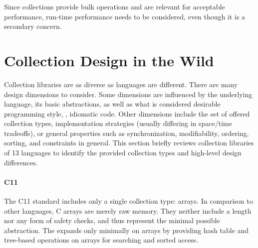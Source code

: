 \documentclass[sigconf, 10pt]{acmart}
\begin{document}
Since collections provide bulk operations
and are relevant for acceptable performance,
run-time performance needs to be considered,
even though it is a secondary concern.

\section{Collection Design in the Wild}
\label{sec:col-wild}


Collection libraries are as diverse as languages are different.
There are many design dimensions to consider.
Some dimensions are influenced by the underlying language,
its basic abstractions,
as well as what is considered desirable programming style, \ie, idiomatic code.
Other dimensions include the set of offered collection types,
implementation strategies (usually differing in space/time tradeoffs),
or general properties such as synchronization, modifiability, ordering,
sorting, and constraints in general.
%
This section briefly reviews collection libraries of 13 languages
to identify the provided collection types
and high-level design differences.

\paragraph{C11}


The C11 standard includes only a single collection type: arrays.
In comparison to other languages, C arrays are merely raw memory.
They neither include a length nor any form of safety checks,
and thus represent the minimal possible abstraction.
The 
expands only minimally on arrays
by providing hash table and tree-based operations on arrays
for searching and sorted access.
\end{document}
